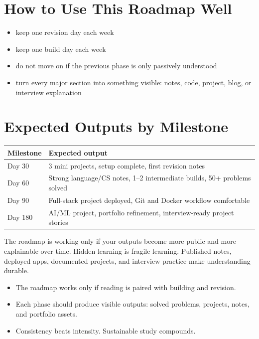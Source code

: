 \documentclass[12pt, a4paper, oneside]{book}
\begin{document}
\section{How to Use This Roadmap Well}

\begin{itemize}[leftmargin=2em]
    \item keep one revision day each week
    \item keep one build day each week
    \item do not move on if the previous phase is only passively understood
    \item turn every major section into something visible: notes, code, project, blog, or interview explanation
\end{itemize}

\section{Expected Outputs by Milestone}

\begin{center}
\begin{tabular}{l l}
\toprule
\textbf{Milestone} & \textbf{Expected output} \\
\midrule
Day 30 & 3 mini projects, setup complete, first revision notes \\
Day 60 & Strong language/CS notes, 1--2 intermediate builds, 50+ problems solved \\
Day 90 & Full-stack project deployed, Git and Docker workflow comfortable \\
Day 180 & AI/ML project, portfolio refinement, interview-ready project stories \\
\bottomrule
\end{tabular}
\end{center}

\begin{notebox}
The roadmap is working only if your outputs become more public and more explainable over time. Hidden learning is fragile learning. Published notes, deployed apps, documented projects, and interview practice make understanding durable.
\end{notebox}

\begin{summarybox}
\begin{itemize}[leftmargin=2em]
    \item The roadmap works only if reading is paired with building and revision.
    \item Each phase should produce visible outputs: solved problems, projects, notes, and portfolio assets.
    \item Consistency beats intensity. Sustainable study compounds.
\end{itemize}
\end{summarybox}
\end{document}
